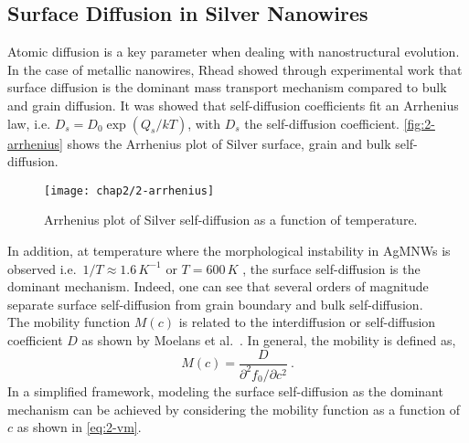 \subsection{Surface Diffusion in Silver Nanowires}
    Atomic diffusion is a key parameter when dealing with nanostructural evolution. In the case of metallic nanowires, Rhead \cite{Rhead1963} showed through experimental work that surface diffusion is the dominant mass transport mechanism compared to bulk and grain diffusion. It was showed that self-diffusion coefficients fit an Arrhenius law, i.e. $D_s = D_0 \exp(Q_s/kT)$, with $D_s$ the self-diffusion coefficient. \autoref{fig:2-arrhenius} shows the Arrhenius plot of Silver surface, grain and bulk self-diffusion.
    \begin{figure}[H]
        \centering
        \texttt{[image: chap2/2-arrhenius]}
        \caption{Arrhenius plot of Silver self-diffusion as a function of temperature. \cite{Wejrzanowski2017}}
        \label{fig:2-arrhenius}
    \end{figure}
    In addition, at temperature where the morphological instability in AgMNWs is observed i.e.\ $1/T\approx 1.6 \,K^{-1}$ or $T=600\,K$ \cite{Langley2014}, the surface self-diffusion is the dominant mechanism. Indeed, one can see that several orders of magnitude separate surface self-diffusion from grain boundary and bulk self-diffusion.\\
    The mobility function $M(c)$ is related to the interdiffusion or self-diffusion coefficient $D$ as shown by Moelans et al.~\cite{MoelansBlanpainWollants2008}. In general, the mobility is defined as,
    \begin{equation}
        M(c) = \frac{D}{\partial^2 f_0 / \partial c^2}\ .
    \end{equation}
    In a simplified framework, modeling the surface self-diffusion as the dominant mechanism can be achieved by considering the mobility function as a function of $c$ as shown in \autoref{eq:2-vm}.